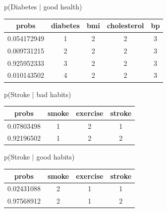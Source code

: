 \documentclass[11pt]{article}
\begin{document}
p(Diabetes $|$ good health)

\begin{table}[!hbt]
\begin{center}
\begin{tabular}{ |c|c|c|c|c| }
  \hline
  probs & diabetes & bmi & cholesterol & bp \\
  \hline
  0.054172949 & 1 & 2 & 2 & 3\\
  \hline
  0.009731215 & 2 & 2 & 2 & 3 \\
  \hline
  0.925952333  & 3  &  2 &  2 & 3 \\
  \hline
  0.010143502  &   4  & 2   & 2 & 3 \\
  \hline
\end{tabular}
\end{center}
\end{table}
\vspace{-20pt}

p(Stroke $|$ bad habits)

\begin{table}[!hbt]
\begin{center}
\begin{tabular}{ |c|c|c|c| }
  \hline
  probs & smoke & exercise & stroke \\
  \hline
  0.07803498 & 1 & 2 & 1 \\
  \hline
  0.92196502 & 1 & 2 & 2 \\
  \hline
\end{tabular}
\end{center}
\end{table}
\vspace{-20pt}

p(Stroke $|$ good habits)

\begin{table}[!hbt]
\begin{center}
\begin{tabular}{ |c|c|c|c| }
  \hline
  probs & smoke & exercise & stroke \\
  \hline
  0.02431088 & 2 & 1 & 1 \\
  \hline
  0.97568912 & 2 & 1 & 2 \\
  \hline
\end{tabular}
\end{center}
\end{table}
\vspace{-20pt}

\clearpage

\end{document}
